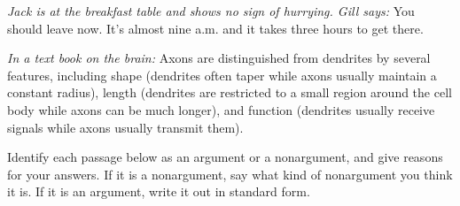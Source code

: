 \begin{exercises}
\item \textit{Jack is at the breakfast table and shows no sign of hurrying. Gill says:} You should leave now. It's almost nine a.m. and it takes three hours to get there.

      
\item \textit{In a text book on the brain:} Axons are distinguished from dendrites by several features, including shape (dendrites often taper while axons usually maintain a constant radius), length (dendrites are restricted to a small region around the cell body while axons can be much longer), and function (dendrites usually receive signals while axons usually transmit them).


\end{exercises}
%
\problempart Identify each passage below as an argument or a nonargument, and give reasons for your answers. If it is a nonargument, say what kind of nonargument you think it is. If it is an argument, write it out in standard form.

